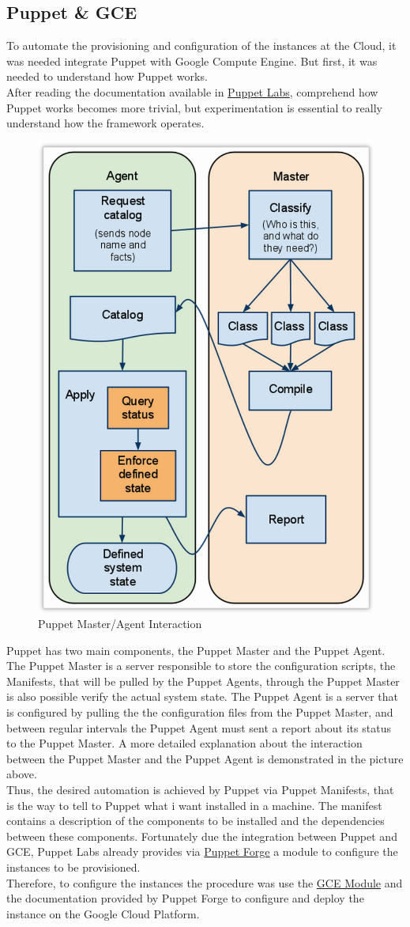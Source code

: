 \documentclass[12pt, twocolumn]{article}
\begin{document}
 \subsection{Puppet \& GCE}
 To automate the provisioning and configuration of the instances at the Cloud, it was needed integrate Puppet with Google Compute Engine. But first, it was needed to understand how Puppet works.\\
 After reading the documentation available in \href{https://docs.puppetlabs.com/}{Puppet Labs}, comprehend how Puppet works becomes more trivial, but experimentation is essential to really understand how the framework operates.\\
 
 \begin{figure}[htb!] %
    \centering
    \includegraphics[width=.45\textwidth]{puppet} 
    \caption{Puppet Master/Agent Interaction}
    \label{fig:puppet}
 \end{figure} 
 
Puppet has two main components, the Puppet Master and the Puppet Agent. The Puppet Master is a server responsible to store the configuration scripts, the Manifests, that will be pulled by the Puppet Agents, through the Puppet Master is also possible verify the actual system state. The Puppet Agent is a server that is configured by pulling the the configuration files from the Puppet Master, and between regular intervals the Puppet Agent must sent a report about its status to the Puppet Master. A more detailed 
 explanation about the interaction between the Puppet Master and the Puppet Agent is demonstrated in the picture above.\\
 Thus, the desired automation is achieved by Puppet via Puppet Manifests, that is the way to tell to Puppet what i want installed in a machine. The manifest  contains a description of the components to be installed and the dependencies between these
 components. Fortunately due the integration between Puppet and GCE, Puppet Labs already provides via  \href{https://forge.puppetlabs.com/}{Puppet Forge} a module to configure the instances to be provisioned.\\
 Therefore, to configure the instances the procedure was use the \href{https://forge.puppetlabs.com/puppetlabs/gce_compute}{GCE Module} and the documentation provided by Puppet Forge to configure and deploy the instance on the Google Cloud Platform.          
\end{document}
